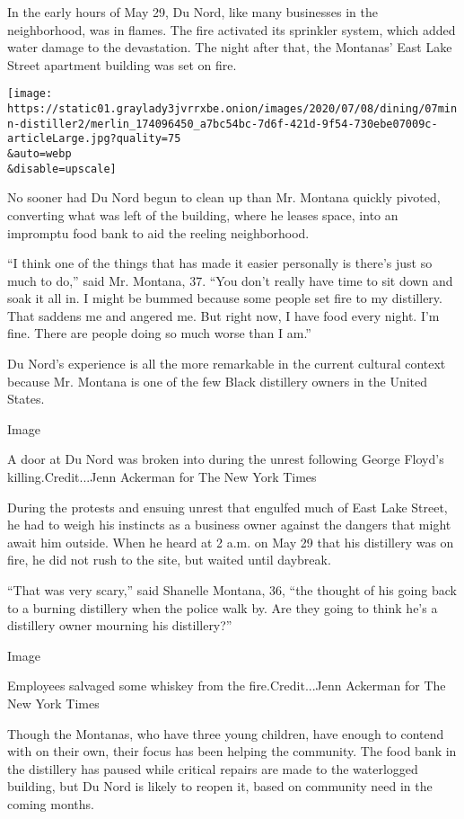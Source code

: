 In the early hours of May 29, Du Nord, like many businesses in the
neighborhood, was in flames. The fire activated its sprinkler system,
which added water damage to the devastation. The night after that, the
Montanas' East Lake Street apartment building was set on fire.

\texttt{[image: https://static01.graylady3jvrrxbe.onion/images/2020/07/08/dining/07minn-distiller2/merlin\_174096450\_a7bc54bc-7d6f-421d-9f54-730ebe07009c-articleLarge.jpg?quality=75\\\&auto=webp\\\&disable=upscale]}

No sooner had Du Nord begun to clean up than Mr. Montana quickly
pivoted, converting what was left of the building, where he leases
space, into an impromptu food bank to aid the reeling neighborhood.

``I think one of the things that has made it easier personally is
there's just so much to do,'' said Mr. Montana, 37. ``You don't really
have time to sit down and soak it all in. I might be bummed because some
people set fire to my distillery. That saddens me and angered me. But
right now, I have food every night. I'm fine. There are people doing so
much worse than I am.''

Du Nord's experience is all the more remarkable in the current cultural
context because Mr. Montana is one of the few Black distillery owners in
the United States.

Image

A door at Du Nord was broken into during the unrest following George
Floyd's killing.Credit...Jenn Ackerman for The New York Times

During the protests and ensuing unrest that engulfed much of East Lake
Street, he had to weigh his instincts as a business owner against the
dangers that might await him outside. When he heard at 2 a.m. on May 29
that his distillery was on fire, he did not rush to the site, but waited
until daybreak.

``That was very scary,'' said Shanelle Montana, 36, ``the thought of his
going back to a burning distillery when the police walk by. Are they
going to think he's a distillery owner mourning his distillery?''

Image

Employees salvaged some whiskey from the fire.Credit...Jenn Ackerman for
The New York Times

Though the Montanas, who have three young children, have enough to
contend with on their own, their focus has been helping the community.
The food bank in the distillery has paused while critical repairs are
made to the waterlogged building, but Du Nord is likely to reopen it,
based on community need in the coming months.

